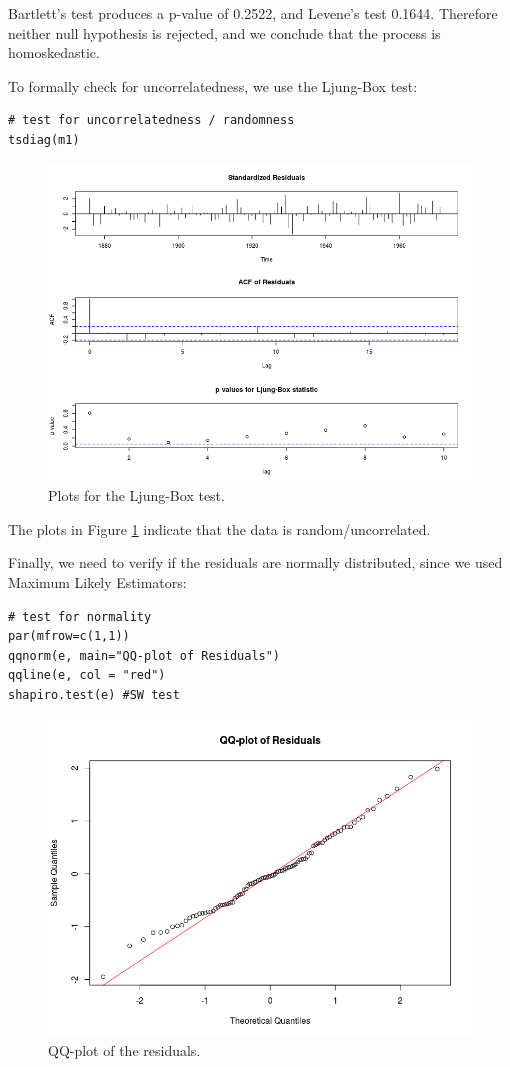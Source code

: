 \documentclass[]{article}
\begin{document}
Bartlett's test produces a p-value of 0.2522, and Levene's test 0.1644. Therefore neither null hypothesis is rejected, and we conclude that the process is homoskedastic.

To formally check for uncorrelatedness, we use the Ljung-Box test:
\begin{Verbatim}[frame=single]
# test for uncorrelatedness / randomness
tsdiag(m1)
\end{Verbatim}

\begin{figure}[!ht]
\centering
\includegraphics[width=.8\textwidth]{huronljung.png}
\caption{Plots for the Ljung-Box test.}
\label{huronljung}
\end{figure}

The plots in Figure \ref{huronljung} indicate that the data is random/uncorrelated.

Finally, we need to verify if the residuals are normally distributed, since we used Maximum Likely Estimators:
\begin{Verbatim}[frame=single]
# test for normality
par(mfrow=c(1,1))
qqnorm(e, main="QQ-plot of Residuals")
qqline(e, col = "red")
shapiro.test(e) #SW test
\end{Verbatim}

\begin{figure}[!ht]
\centering
\includegraphics[width=.8\textwidth]{huronqq.png}
\caption{QQ-plot of the residuals.}
\label{huronqq}
\end{figure}
\end{document}
